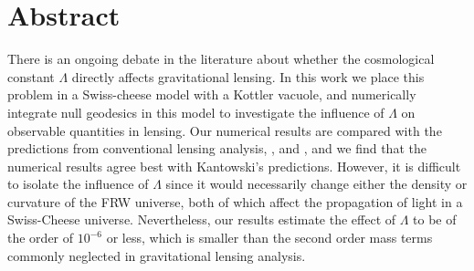 \chapter*{\centering Abstract}

There is an ongoing debate in the literature about whether the cosmological constant $\Lambda$ directly affects gravitational lensing. In this work we place this problem in a Swiss-cheese model with a Kottler vacuole, and numerically integrate null geodesics in this model to investigate the influence of $\Lambda$ on observable quantities in lensing. Our numerical results are compared with the predictions from conventional lensing analysis, \citet{rindler2007contribution}, and \citet{kantowski2010gravitational}, and we find that the numerical results agree best with Kantowski's predictions. However, it is difficult to isolate the influence of $\Lambda$ since it would necessarily change either the density or curvature of the FRW universe, both of which affect the propagation of light in a Swiss-Cheese universe. Nevertheless, our results estimate the effect of $\Lambda$ to be of the order of $10^{-6}$ or less, which is smaller than the second order mass terms commonly neglected in gravitational lensing analysis. 